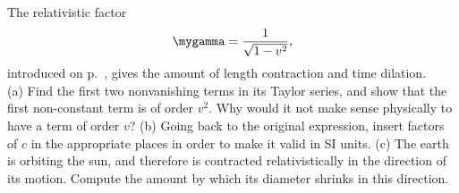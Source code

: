 The relativistic factor
\begin{equation*} 
  \mygamma = \frac{1}{\sqrt{1-v^2}},
\end{equation*} 
introduced on p.~\pageref{gamma-factor-defined}, gives the amount of length contraction and time dilation.\\
(a) Find the first two nonvanishing terms
in its Taylor series, and show that
the first non-constant term is of order $v^2$. Why would it not make sense physically to have
a term of order $v$?\answercheck\hwendpart
(b) Going back to the original expression,
insert factors of $c$ in the appropriate places in order to make it valid in SI units.\answercheck\hwendpart
(c) The earth is orbiting the sun, and therefore is contracted relativistically in the
direction of its motion. Compute the amount by which its diameter shrinks in this
direction.\answercheck\hwendpart
